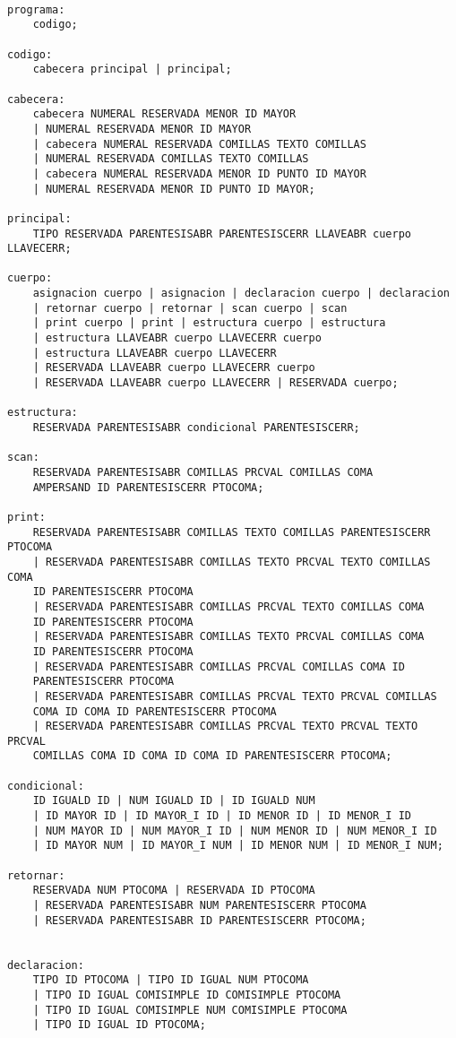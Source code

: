 \documentclass[aspectratio=169]{article}
\begin{document}
\begin{lstlisting}

programa:
	codigo;

codigo:
	cabecera principal | principal;

cabecera:
	cabecera NUMERAL RESERVADA MENOR ID MAYOR
	| NUMERAL RESERVADA MENOR ID MAYOR
	| cabecera NUMERAL RESERVADA COMILLAS TEXTO COMILLAS
	| NUMERAL RESERVADA COMILLAS TEXTO COMILLAS
	| cabecera NUMERAL RESERVADA MENOR ID PUNTO ID MAYOR
	| NUMERAL RESERVADA MENOR ID PUNTO ID MAYOR;

principal:
	TIPO RESERVADA PARENTESISABR PARENTESISCERR LLAVEABR cuerpo LLAVECERR;

cuerpo:
	asignacion cuerpo | asignacion | declaracion cuerpo | declaracion
	| retornar cuerpo | retornar | scan cuerpo | scan
	| print cuerpo | print | estructura cuerpo | estructura
	| estructura LLAVEABR cuerpo LLAVECERR cuerpo
	| estructura LLAVEABR cuerpo LLAVECERR
	| RESERVADA LLAVEABR cuerpo LLAVECERR cuerpo
	| RESERVADA LLAVEABR cuerpo LLAVECERR | RESERVADA cuerpo;

estructura:
	RESERVADA PARENTESISABR condicional PARENTESISCERR;

scan:
	RESERVADA PARENTESISABR COMILLAS PRCVAL COMILLAS COMA
	AMPERSAND ID PARENTESISCERR PTOCOMA;

print:
	RESERVADA PARENTESISABR COMILLAS TEXTO COMILLAS PARENTESISCERR PTOCOMA
	| RESERVADA PARENTESISABR COMILLAS TEXTO PRCVAL TEXTO COMILLAS COMA
	ID PARENTESISCERR PTOCOMA
	| RESERVADA PARENTESISABR COMILLAS PRCVAL TEXTO COMILLAS COMA
	ID PARENTESISCERR PTOCOMA
	| RESERVADA PARENTESISABR COMILLAS TEXTO PRCVAL COMILLAS COMA
	ID PARENTESISCERR PTOCOMA
	| RESERVADA PARENTESISABR COMILLAS PRCVAL COMILLAS COMA ID
	PARENTESISCERR PTOCOMA
	| RESERVADA PARENTESISABR COMILLAS PRCVAL TEXTO PRCVAL COMILLAS
	COMA ID COMA ID PARENTESISCERR PTOCOMA
	| RESERVADA PARENTESISABR COMILLAS PRCVAL TEXTO PRCVAL TEXTO PRCVAL
	COMILLAS COMA ID COMA ID COMA ID PARENTESISCERR PTOCOMA;

condicional:
	ID IGUALD ID | NUM IGUALD ID | ID IGUALD NUM
	| ID MAYOR ID | ID MAYOR_I ID | ID MENOR ID | ID MENOR_I ID
	| NUM MAYOR ID | NUM MAYOR_I ID | NUM MENOR ID | NUM MENOR_I ID
	| ID MAYOR NUM | ID MAYOR_I NUM | ID MENOR NUM | ID MENOR_I NUM;

retornar:
	RESERVADA NUM PTOCOMA | RESERVADA ID PTOCOMA
	| RESERVADA PARENTESISABR NUM PARENTESISCERR PTOCOMA
	| RESERVADA PARENTESISABR ID PARENTESISCERR PTOCOMA;


declaracion:
	TIPO ID PTOCOMA | TIPO ID IGUAL NUM PTOCOMA
	| TIPO ID IGUAL COMISIMPLE ID COMISIMPLE PTOCOMA
	| TIPO ID IGUAL COMISIMPLE NUM COMISIMPLE PTOCOMA
	| TIPO ID IGUAL ID PTOCOMA;


\end{lstlisting}
\end{document}
